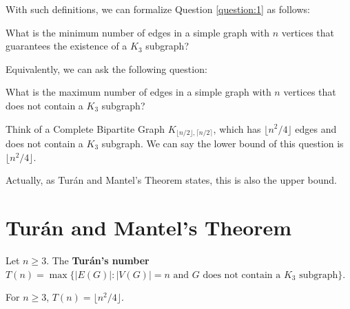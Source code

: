 With such definitions, we can formalize Question \ref{question:1} as follows:

\begin{question}
	What is the minimum number of edges in a simple graph with $n$ vertices that guarantees the existence of a $K_3$ subgraph?
\end{question}

Equivalently, we can ask the following question:

\begin{question}
	What is the maximum number of edges in a simple graph with $n$ vertices that does not contain a $K_3$ subgraph?
\end{question}

Think of a Complete Bipartite Graph $K_{\lfloor n/2\rfloor, \lceil n/2\rceil}$, which has $\lfloor n^2/4\rfloor$ edges and does not contain a $K_3$ subgraph. We can say the lower bound of this question is $\lfloor n^2/4\rfloor$.

Actually, as Tur\'{a}n and Mantel's Theorem states, this is also the upper bound.

\section{Tur\'{a}n and Mantel's Theorem}

\begin{definition}
	Let $n\ge 3$. The \textbf{Tur\'{a}n's number} $T(n) = \max\{|E(G)|: |V(G)|=n\text{ and }G\text{ does not contain a }K_3\text{ subgraph}\}$.
\end{definition}

\begin{theorem}
	For $n\ge 3$, $T(n) = \lfloor n^2/4\rfloor$.
\end{theorem}
